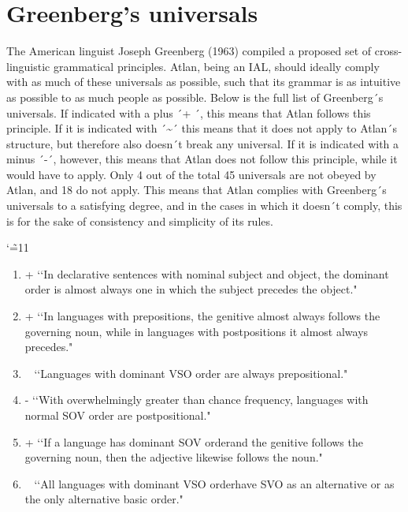 \section{Greenberg's universals}

The American linguist Joseph Greenberg (1963) compiled a proposed set of cross-linguistic grammatical principles. Atlan, being an IAL, should ideally comply with as much of these universals as possible, such that its grammar is as intuitive as possible to as much people as possible. Below is the full list of Greenberg´s universals. If indicated with a plus ´+ ´, this means that Atlan follows this principle. If it is indicated with ´\~{}´ this means that it does not apply to Atlan´s structure, but therefore also doesn´t break any universal. If it is indicated with a minus ´-´, however, this means that Atlan does not follow this principle, while it would have to apply. Only 4 out of the total 45 universals are not obeyed by Atlan, and 18 do not apply. This means that Atlan complies with Greenberg´s universals to a satisfying degree, and in the cases in which it doesn´t comply, this is for the sake of consistency and simplicity of its rules. 

\begingroup
\catcode`\~=11
\begin{enumerate}
\item +  \lq\lq In declarative sentences with nominal subject and object, the dominant order is almost always one in which the subject precedes the object." 

\item +  \lq\lq In languages with prepositions, the genitive almost always follows the governing noun, while in languages with postpositions it almost always precedes." 

\item ~  \lq\lq Languages with dominant VSO order are always prepositional." 

\item -  \lq\lq With overwhelmingly greater than chance frequency, languages with normal SOV order are postpositional." 

\item +  \lq\lq If a language has dominant SOV orderand the genitive follows the governing noun, then the adjective likewise follows the noun." 

\item ~  \lq\lq All languages with dominant VSO orderhave SVO as an alternative or as the only alternative basic order." 
\end{enumerate}

